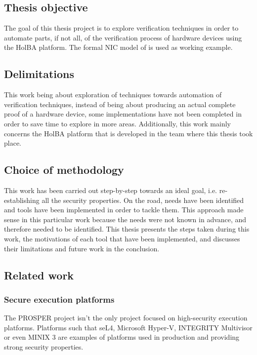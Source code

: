 \documentclass[10pt,a4paper]{article}
\begin{document}
\begin{multicols}{2}
\subsection{Thesis objective}

The goal of this thesis project is to explore verification techniques in order to automate parts, if not all, of the verification process of hardware devices using the HolBA platform. The formal {NIC} model of \cite{haglund_formal_2016} is used as working example.

\subsection{Delimitations}

This work being about exploration of techniques towards automation of verification techniques, instead of being about producing an actual complete proof of a hardware device, some implementations have not been completed in order to save time to explore in more areas. Additionally, this work mainly concerns the HolBA platform that is developed in the team where this thesis took place.

\subsection{Choice of methodology}

This work has been carried out step-by-step towards an ideal goal, i.e. re-establishing all the security properties. On the road, needs have been identified and tools have been implemented in order to tackle them. This approach made sense in this particular work because the needs were not known in advance, and therefore needed to be identified. This thesis presents the steps taken during this work, the motivations of each tool that have been implemented, and discusses their limitations and future work in the conclusion.

\subsection{Related work}

\subsubsection{Secure execution platforms}

The {PROSPER} project isn't the only project focused on high-security execution platforms. Platforms such that seL4, Microsoft Hyper-V, INTEGRITY Multivisor or even MINIX 3 are examples of platforms used in production and providing strong security properties.


\end{multicols}
\end{document}
